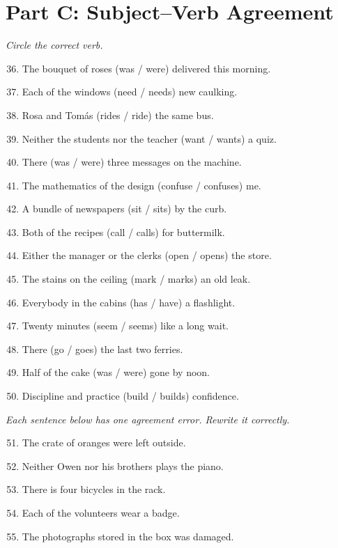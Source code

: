 \documentclass[11pt]{article}
\begin{document}
\section*{Part C: Subject--Verb Agreement}
\noindent\textit{Circle the correct verb.}
\begin{enumerate}\setcounter{enumi}{35}
  \item The bouquet of roses (was / were) delivered this morning.
  \item Each of the windows (need / needs) new caulking.
  \item Rosa and Tom\'as (rides / ride) the same bus.
  \item Neither the students nor the teacher (want / wants) a quiz.
  \item There (was / were) three messages on the machine.
  \item The mathematics of the design (confuse / confuses) me.
  \item A bundle of newspapers (sit / sits) by the curb.
  \item Both of the recipes (call / calls) for buttermilk.
  \item Either the manager or the clerks (open / opens) the store.
  \item The stains on the ceiling (mark / marks) an old leak.
  \item Everybody in the cabins (has / have) a flashlight.
  \item Twenty minutes (seem / seems) like a long wait.
  \item There (go / goes) the last two ferries.
  \item Half of the cake (was / were) gone by noon.
  \item Discipline and practice (build / builds) confidence.
\end{enumerate}

\vspace{6pt}
\noindent\textit{Each sentence below has one agreement error. Rewrite it correctly.}
\begin{enumerate}\setcounter{enumi}{50}
  \item The crate of oranges were left outside.
  \vspace{0.55in}
  \item Neither Owen nor his brothers plays the piano.
  \vspace{0.55in}
  \item There is four bicycles in the rack.
  \vspace{0.55in}
  \item Each of the volunteers wear a badge.
  \vspace{0.55in}
  \item The photographs stored in the box was damaged.
  \vspace{0.55in}
\end{enumerate}
\end{document}
